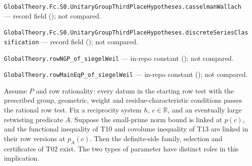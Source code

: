 \noindent\nolinkurl{GlobalTheory.Fc.S0.UnitaryGroupThirdPlaceHypotheses.casselmanWallach} --- record field (); not compared.\par
\noindent\nolinkurl{GlobalTheory.Fc.S0.UnitaryGroupThirdPlaceHypotheses.discreteSeriesClassification} --- record field (); not compared.\par
\noindent\nolinkurl{GlobalTheory.rowNGP_of_siegelWeil} --- in-repo constant (); not compared.\par
\noindent\nolinkurl{GlobalTheory.rowMainEqP_of_siegelWeil} --- in-repo constant (); not compared.\par

\begin{formalstatement}\label{sub:T03}

Assume $P$ and row rationality: every datum in the starting row test with the
prescribed group, geometric, weight and residue-characteristic conditions passes
the rational row test. Fix a reciprocity system $h$, $c\in\mathbb R$, and an
eventually large retwisting predicate $A$. Suppose the small-prime norm bound
is linked at $p(c)$, and the functional inequality of T10 and covolume
inequality of T13 are linked in their row versions at $p_A(c)$.
Then the definite-side family, selection and certificates of T02 exist.
The two types of parameter have distinct roles in this implication.

\end{formalstatement}
